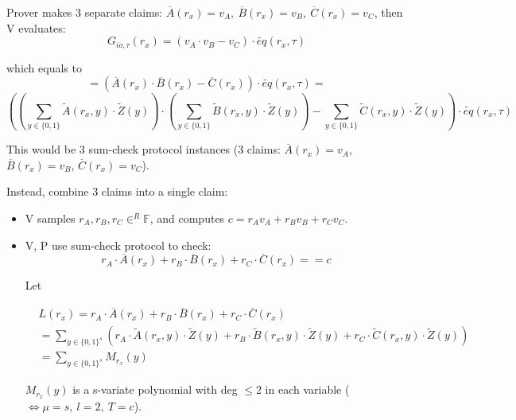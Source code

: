 \documentclass{article}
\theoremstyle{definition}
\begin{document}
Prover makes 3 separate claims: $\overline{A}(r_x)=v_A,~ \overline{B}(r_x)=v_B,~ \overline{C}(r_x)=v_C$,
then V evaluates:
$$G_{io, \tau}(r_x) = (v_A \cdot v_B - v_C) \cdot \widetilde{eq}(r_x, \tau)$$


\begin{footnotesize}
	which equals to
	$$=\left(\overline{A}(r_x) \cdot \overline{B}(r_x) - \overline{C}(r_x)\right) \cdot \widetilde{eq}(r_x, \tau)=$$
	$$\left(\left(\sum_{y \in \{0,1\}} \widetilde{A}(r_x, y) \cdot \widetilde{Z}(y)\right) \cdot \left(\sum_{y \in \{0,1\}} \widetilde{B}(r_x, y) \cdot \widetilde{Z}(y)\right) - \sum_{y \in \{0,1\}} \widetilde{C}(r_x, y) \cdot \widetilde{Z}(y)\right) \cdot \widetilde{eq}(r_x, \tau)$$
\end{footnotesize}

\vspace{0.5cm}

This would be 3 sum-check protocol instances (3 claims: $\overline{A}(r_x)=v_A$, $\overline{B}(r_x)=v_B$, $\overline{C}(r_x)=v_C$).

Instead, combine 3 claims into a single claim:

\begin{itemize}
	\item V samples $r_A, r_B, r_C \in^R \mathbb{F}$, and computes $c= r_A v_A + r_B v_B + r_C v_C$.
	\item V, P use sum-check protocol to check:
$$r_A \cdot \overline{A}(r_x) + r_B \cdot \overline{B}(r_x) + r_C \cdot \overline{C}(r_x) == c$$


Let
\begin{small}
\begin{align*}
	&L(r_x) = r_A \cdot \overline{A}(r_x) +r_B \cdot \overline{B}(r_x) +r_C \cdot \overline{C}(r_x)\\
	&= \sum_{y \in \{0,1\}^s}
	       \left( r_A \cdot \widetilde{A}(r_x, y) \cdot \widetilde{Z}(y)
	       + r_B \cdot \widetilde{B}(r_x, y) \cdot \widetilde{Z}(y)
	       + r_C \cdot \widetilde{C}(r_x, y) \cdot \widetilde{Z}(y) \right)\\
	       &= \sum_{y \in \{0,1\}^s} M_{r_x}(y)
\end{align*}
\end{small}

$M_{r_x}(y)$ is a s-variate polynomial with deg $\leq 2$ in each variable ($\Longleftrightarrow \mu = s,~ l=2,~ T=c$).

\end{itemize}
\end{document}
